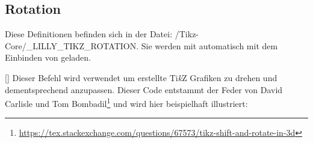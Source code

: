 %
%
%
%
%
%

\subsection{Rotation}
Diese Definitionen befinden sich in der Datei: {\ltt\LILLYxPATHxGRAPHICS/Tikz-Core/\_LILLY\_TIKZ\_ROTATION}. Sie werden mit  automatisch mit dem Einbinden von\newline {} geladen.

%
%
%

[]
Dieser Befehl wird verwendet um erstellte Ti\textit{k}Z Grafiken zu drehen und dementsprechend anzupassen. Dieser Code entstammt der Feder von David Carlisle und Tom Bombadil\footnote{\url{https://tex.stackexchange.com/questions/67573/tikz-shift-and-rotate-in-3d}} und wird hier beispielhaft illustriert:
\newcommand{\examplecube}%
{   \coordinate (a) at (-2,-2,-2);
    \coordinate (b) at (-2,-2,2);
    \coordinate (c) at (-2,2,-2);
    \coordinate (d) at (-2,2,2);
    \coordinate (e) at (2,-2,-2);
    \coordinate (f) at (2,-2,2);
    \coordinate (g) at (2,2,-2);
    \coordinate (h) at (2,2,2);
    \draw (a)--(b) (a)--(c) (a)--(e) (b)--(d) (b)--(f) (c)--(d) (c)--(g) (d)--(h) (e)--(f) (e)--(g) (f)--(h) (g)--(h);
    \fill[Ao] (a) circle (0.1cm);
    \fill[tealblue] (d) ++(0.1cm,0.1cm) rectangle ++(-0.2cm,-0.2cm);
}
